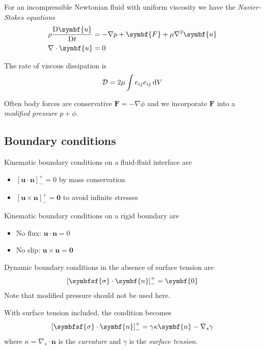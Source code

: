 \documentclass{jknotes}
\begin{document}
For an incompressible Newtonian fluid with uniform viscosity we have the
\emph{Navier-Stokes equations}
\begin{equation}
	\begin{aligned}
		\rho \frac{\diffD{\symbf{u}}}{\diffD{t}} &= - \nabla p + \symbf{F} + \mu
			\nabla^2 \symbf{u} \\
			\nabla \cdot \symbf{u} &=0
	\end{aligned}
\end{equation}

The rate of viscous dissipation is
\begin{equation}
	\mathcal{D} = 2 \mu \int e_{ij} e_{ij} \, \diffd{V}
\end{equation}

Often body forces are conservative $\symbf{F} = -\nabla \phi$ and we incorporate
$\symbf{F}$ into a \emph{modified pressure} $p + \phi$.

\subsection{Boundary conditions}
Kinematic boundary conditions on a fluid-fluid interface are
\begin{itemize}
	\item $\left[ \symbf{u} \cdot \symbf{n} \right]^+_- = 0$ by mass conservation
	\item $\left[ \symbf{u} \times \symbf{n} \right]^+_- = \symbf{0}$ to avoid infinite
		stresses
\end{itemize}

Kinematic boundary conditions on a rigid boundary are
\begin{itemize}
	\item No flux: $\symbf{u} \cdot \symbf{n} = 0$
	\item No slip: $\symbf{u} \times \symbf{n} = \symbf{0}$
\end{itemize}

Dynamic boundary conditions in the absence of surface tension are 
\begin{equation}
	\left[\symbfsf{\sigma} \cdot \symbf{n}\right]^+_- = \symbf{0}
\end{equation}
Note that modified pressure should not be used here.

With surface tension included, the condition becomes
\begin{equation}
	\left[ \symbfsf{\sigma} \cdot \symbf{n} \right]^+_- = \gamma \kappa \symbf{n} - \nabla_s
	\gamma
\end{equation}
where $\kappa = \nabla_s \cdot \symbf{n}$ is the \emph{curvature} and $\gamma$ is
the \emph{surface tension}.
\end{document}
